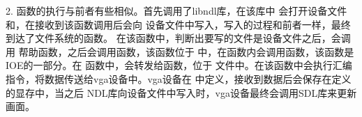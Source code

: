   2. 函数的执行与前者有些相似。首先调用了libndl库，在该库中
  会打开设备文件和，在接收到该函数调用后会向
  设备文件中写入，写入的过程和前者一样，最终到达了文件系统的函数。
  在该函数中，判断出要写的文件是设备文件之后，会调用
  帮助函数，之后会调用函数，该函数位于
  中，在函数内会调用函数，该函数是IOE的一部分。在
  函数中，会转发给函数，位于
  文件中。在该函数中会执行汇编指令，将数据传送给vga设备中。vga设备在
  中定义，接收到数据后会保存在定义的显存中，当之后
  NDL库向设备文件中写入时，vga设备最终会调用SDL库来更新画面。

\vspace{4em}
\noindent{}
